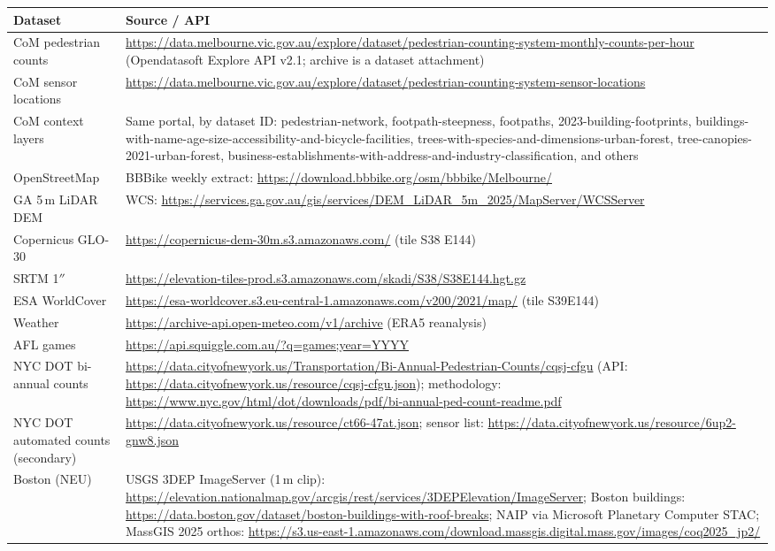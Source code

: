 \documentclass[11pt]{article}
\newcommand{\hrow}{\rowcolor{headgray}}
\begin{document}
\begin{xltabular}{\linewidth}{|L{3.6cm}|Y|}
\hline\hrow
\textbf{Dataset} & \textbf{Source / API} \\\hline
\endhead
CoM pedestrian counts & \url{https://data.melbourne.vic.gov.au/explore/dataset/pedestrian-counting-system-monthly-counts-per-hour} (Opendatasoft Explore API v2.1; archive is a dataset attachment) \\\hline
CoM sensor locations & \url{https://data.melbourne.vic.gov.au/explore/dataset/pedestrian-counting-system-sensor-locations} \\\hline
CoM context layers & Same portal, by dataset ID: pedestrian-network, footpath-steepness, footpaths, 2023-building-footprints, buildings-with-name-age-size-accessibility-and-bicycle-facilities, trees-with-species-and-dimensions-urban-forest, tree-canopies-2021-urban-forest, business-establishments-with-address-and-industry-classification, and others \\\hline
OpenStreetMap & BBBike weekly extract: \url{https://download.bbbike.org/osm/bbbike/Melbourne/} \\\hline
GA 5\,m LiDAR DEM & WCS: \url{https://services.ga.gov.au/gis/services/DEM_LiDAR_5m_2025/MapServer/WCSServer} \\\hline
Copernicus GLO-30 & \url{https://copernicus-dem-30m.s3.amazonaws.com/} (tile S38 E144) \\\hline
SRTM 1$''$ & \url{https://elevation-tiles-prod.s3.amazonaws.com/skadi/S38/S38E144.hgt.gz} \\\hline
ESA WorldCover & \url{https://esa-worldcover.s3.eu-central-1.amazonaws.com/v200/2021/map/} (tile S39E144) \\\hline
Weather & \url{https://archive-api.open-meteo.com/v1/archive} (ERA5 reanalysis) \\\hline
AFL games & \url{https://api.squiggle.com.au/?q=games;year=YYYY} \\\hline
NYC DOT bi-annual counts & \url{https://data.cityofnewyork.us/Transportation/Bi-Annual-Pedestrian-Counts/cqsj-cfgu} (API: \url{https://data.cityofnewyork.us/resource/cqsj-cfgu.json}); methodology: \url{https://www.nyc.gov/html/dot/downloads/pdf/bi-annual-ped-count-readme.pdf} \\\hline
NYC DOT automated counts (secondary) & \url{https://data.cityofnewyork.us/resource/ct66-47at.json}; sensor list: \url{https://data.cityofnewyork.us/resource/6up2-gnw8.json} \\\hline
Boston (NEU) & USGS 3DEP ImageServer (1\,m clip): \url{https://elevation.nationalmap.gov/arcgis/rest/services/3DEPElevation/ImageServer}; Boston buildings: \url{https://data.boston.gov/dataset/boston-buildings-with-roof-breaks}; NAIP via Microsoft Planetary Computer STAC; MassGIS 2025 orthos: \url{https://s3.us-east-1.amazonaws.com/download.massgis.digital.mass.gov/images/coq2025_jp2/} \\\hline
\end{xltabular}
\end{document}
